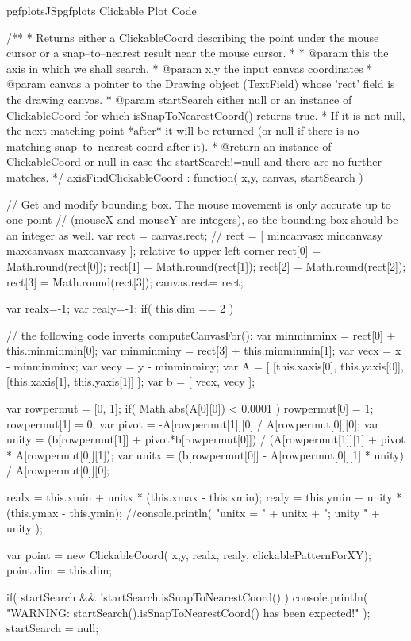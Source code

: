 {{\begin{insDLJS}[processAnnotatedPlot]{pgfplotsJS}{pgfplots Clickable Plot Code}
{	/**
	 * Returns either a ClickableCoord describing the point under the mouse cursor or a snap--to--nearest result near the mouse cursor.
	 *
	 * @param this the axis in which we shall search.
	 * @param x,y the input canvas coordinates
	 * @param canvas a pointer to the Drawing object (TextField) whose 'rect' field is the drawing canvas.
	 * @param startSearch either null or an instance of ClickableCoord for which isSnapToNearestCoord() returns true. 
	 *   If it is not null, the next matching point *after* it will be returned (or null if there is no matching snap--to--nearest coord after it).
	 * @return an instance of ClickableCoord or null in case the startSearch!=null and there are no further matches.
	 */
	axisFindClickableCoord : function( x,y, canvas, startSearch )
	{
		// Get and modify bounding box. The mouse movement is only accurate up to one point 
		// (mouseX and mouseY are integers), so the bounding box should be an integer as well.
		var rect = canvas.rect; // rect = [ mincanvasx mincanvasy maxcanvasx maxcanvasy ]; relative to upper left corner
		rect[0] = Math.round(rect[0]);
		rect[1] = Math.round(rect[1]);
		rect[2] = Math.round(rect[2]);
		rect[3] = Math.round(rect[3]);
		canvas.rect= rect;

		var realx=-1;
		var realy=-1;
		if( this.dim == 2 ) {
			// the following code inverts computeCanvasFor():
			var minminminx = rect[0] + this.minminmin[0];
			var minminminy = rect[3] + this.minminmin[1];
			var vecx = x - minminminx;
			var vecy = y - minminminy;
			var A = [ 
				[this.xaxis[0], this.yaxis[0]],
				[this.xaxis[1], this.yaxis[1]] ];
			var b = [ vecx, vecy ];

			var rowpermut = [0, 1];
			if( Math.abs(A[0][0]) < 0.0001 ) {
				rowpermut[0] = 1;
				rowpermut[1] = 0;
			}
			var pivot = -A[rowpermut[1]][0] / A[rowpermut[0]][0];
			var unity = (b[rowpermut[1]] + pivot*b[rowpermut[0]]) / (A[rowpermut[1]][1] + pivot * A[rowpermut[0]][1]);
			var unitx = (b[rowpermut[0]] - A[rowpermut[0]][1] * unity) / A[rowpermut[0]][0];

			realx = this.xmin + unitx * (this.xmax - this.xmin);
			realy = this.ymin + unity * (this.ymax - this.ymin);
			//console.println( "unitx = " + unitx + "; unity " + unity );
		}


		var point = new ClickableCoord( x,y, realx, realy, clickablePatternForXY);
		point.dim = this.dim;

		if( startSearch && !startSearch.isSnapToNearestCoord() ) {
			console.println( "WARNING: startSearch().isSnapToNearestCoord() has been expected!" );
			startSearch = null;
		}
		
}}
\end{insDLJS}}}

